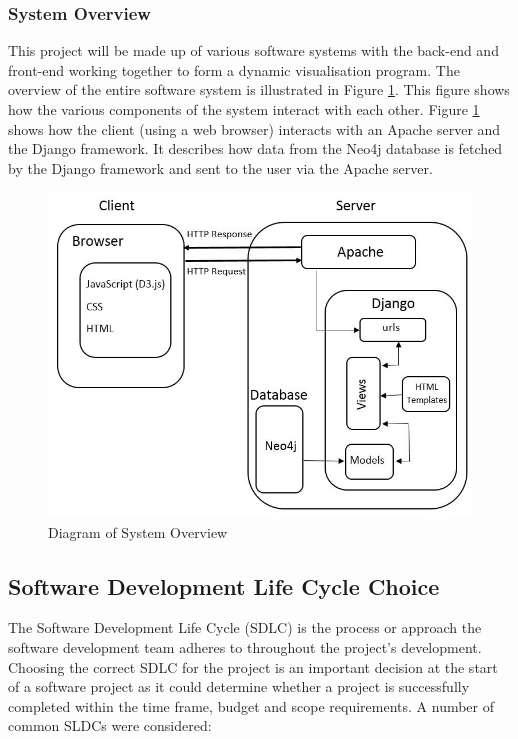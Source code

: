 \documentclass[12pt,onecolumn]{article}
\begin{document}
	\subsubsection{System Overview}
	This project will be made up of various software systems with the back-end and front-end working together to form a dynamic visualisation program. The overview of the entire software system is illustrated in Figure \ref{system}. This figure shows how the various components of the system interact with each other. Figure \ref{system} shows how the client (using a web browser) interacts with an Apache server and the Django framework. It describes how data from the Neo4j database is fetched by the Django framework and sent to the user via the Apache server.

	\begin{figure}[h]
		\centering
		\includegraphics[width=\textwidth]{system}
		\caption{Diagram of System Overview}
		\label{system}
	\end{figure}

	\subsection{Software Development Life Cycle Choice}
	The Software Development Life Cycle (SDLC) is the process or approach the software development team adheres to throughout the project's development. Choosing the correct SDLC for the project is an important decision at the start of a software project as it could determine whether a project is successfully completed within the time frame, budget and scope requirements. A number of common SLDCs were considered:
\end{document}
